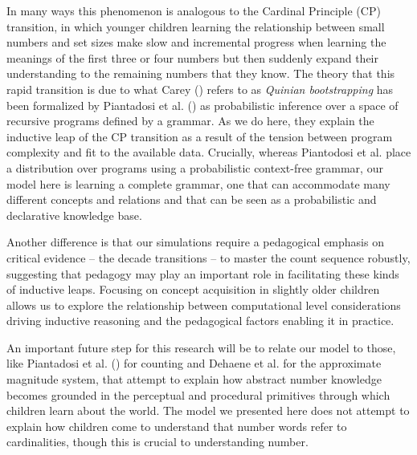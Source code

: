 \documentclass[10pt,letterpaper]{article}
\begin{document}
In many ways this phenomenon is analogous to the Cardinal Principle
(CP) transition, in which younger children learning the relationship
between small numbers and set sizes make slow and incremental progress
when learning the meanings of the first three or four numbers but then
suddenly expand their understanding to the remaining numbers that
they know. The theory that this rapid transition is due to what Carey
(\citeyear{Car2009}) refers to as \emph{Quinian bootstrapping} has
been formalized by Piantadosi et al. (\citeyear{PianGoodTen2012}) as
probabilistic inference over a space of recursive programs defined by
a grammar. As we do here, they explain the inductive leap of the CP
transition as a result of the tension between program complexity and
fit to the available data. Crucially, whereas Piantodosi et al. place
a distribution over programs using a probabilistic context-free
grammar, our model here is learning a complete grammar, one that can
accommodate many different concepts and relations and that can be seen
as a probabilistic and declarative knowledge base.

Another difference is that our simulations require a pedagogical
emphasis on critical evidence -- the decade transitions -- to master
the count sequence robustly, suggesting that pedagogy may play an
important role in facilitating these kinds of inductive leaps.
Focusing on concept acquisition in slightly older children allows us
to explore the relationship between computational level considerations
driving inductive reasoning and the pedagogical factors enabling it in
practice.

An important future step for this research will be to relate our model
to those, like Piantadosi et al. (\citeyear{PianGoodTen2012}) for
counting and Dehaene et al. for the approximate magnitude system, that
attempt to explain how abstract number knowledge becomes grounded in
the perceptual and procedural primitives through which children learn
about the world. The model we presented here does not attempt to
explain how children come to understand that number words refer to
cardinalities, though this is crucial to understanding number.
\end{document}
